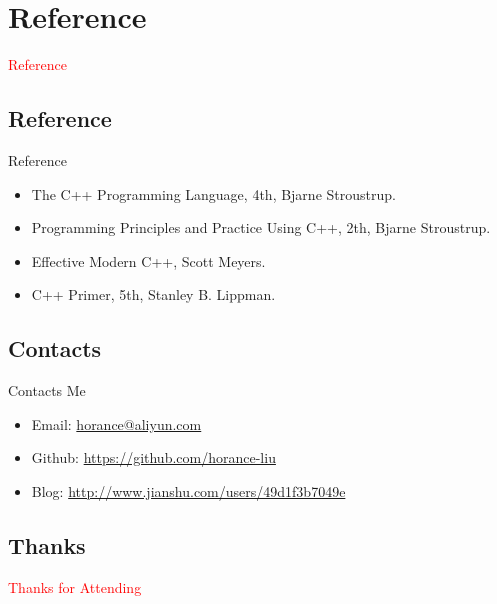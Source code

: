 \section{Reference}
\label{sec:reference}

\begin{frame}
  \begin{center}
    \Huge{\textcolor{red}{Reference}}
  \end{center}
\end{frame}

\subsection{Reference}

\begin{frame}{Reference}
    \begin{itemize}
    \item \alert{The C++ Programming Language, 4th}, Bjarne Stroustrup.
    \item \alert{Programming Principles and Practice Using C++, 2th}, Bjarne Stroustrup.
    \item \alert{Effective Modern C++}, Scott Meyers.
    \item \alert{C++ Primer, 5th}, Stanley B. Lippman.
    \end{itemize}
\end{frame}

\subsection{Contacts}

\begin{frame}{Contacts Me}
    \begin{itemize}
    \item \alert{Email}: \href{horance@aliyun.com}{horance@aliyun.com}
    \item \alert{Github}: \href{https://github.com/horance-liu}{https://github.com/horance-liu} 
    \item \alert{Blog}: \href{http://www.jianshu.com/users/49d1f3b7049e}{http://www.jianshu.com/users/49d1f3b7049e}
    \end{itemize}
\end{frame}

\subsection{Thanks}

\begin{frame}{}
  \begin{center}
    \Huge{\textcolor{red}{Thanks for Attending}}
  \end{center}
\end{frame}